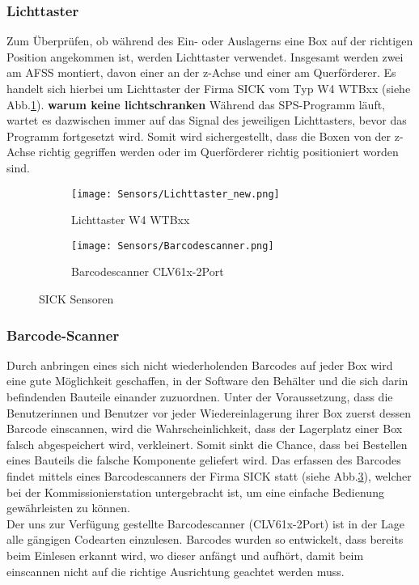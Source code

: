 \subsubsection{Lichttaster}
Zum Überprüfen, ob während des Ein- oder Auslagerns eine Box auf der richtigen Position angekommen ist, werden Lichttaster verwendet. Insgesamt werden zwei am AFSS montiert, davon einer an der z-Achse und einer am Querförderer. Es handelt sich hierbei um Lichttaster der Firma SICK vom Typ W4 WTBxx (siehe Abb.\ref{lichttaster}).
\textbf{warum keine lichtschranken}
Während das SPS-Programm läuft, wartet es dazwischen immer auf das Signal des jeweiligen Lichttasters, bevor das Programm fortgesetzt wird. Somit wird sichergestellt, dass die Boxen von der z-Achse richtig gegriffen werden oder im Querförderer richtig positioniert worden sind.

\begin{figure}[H]
    \centering
    \begin{subfigure}{.4\textwidth}
        \centering
        \texttt{[image: Sensors/Lichttaster\_new.png]}
        \caption{Lichttaster W4 WTBxx\cite{Lichttaster_pic}}
        \label{lichttaster}
    \end{subfigure}
    \begin{subfigure}{.4\textwidth}
        \centering
        \texttt{[image: Sensors/Barcodescanner.png]}
        \caption{Barcodescanner CLV61x-2Port\cite{BarScan_pic}}
        \label{BarScan}
    \end{subfigure}
    \caption{SICK Sensoren}
\end{figure}

\subsubsection{Barcode-Scanner}
Durch anbringen eines sich nicht wiederholenden Barcodes auf jeder Box wird eine gute Möglichkeit geschaffen, in der Software den Behälter und die sich darin befindenden Bauteile einander zuzuordnen. Unter der Voraussetzung, dass die Benutzerinnen und Benutzer vor jeder Wiedereinlagerung ihrer Box zuerst dessen Barcode einscannen, wird die Wahrscheinlichkeit, dass der Lagerplatz einer Box falsch abgespeichert wird, verkleinert. Somit sinkt die Chance, dass bei Bestellen eines Bauteils die falsche Komponente geliefert wird. Das erfassen des Barcodes findet mittels eines Barcodescanners der Firma SICK statt (siehe Abb.\ref{BarScan}), welcher bei der Kommissionierstation untergebracht ist, um eine einfache Bedienung gewährleisten zu können.\\
Der uns zur Verfügung gestellte Barcodescanner (CLV61x-2Port) ist in der Lage alle gängigen Codearten einzulesen.\cite{Barcodescanner} Barcodes wurden so entwickelt, dass bereits beim Einlesen erkannt wird, wo dieser anfängt und aufhört, damit beim einscannen nicht auf die richtige Ausrichtung geachtet werden muss.



